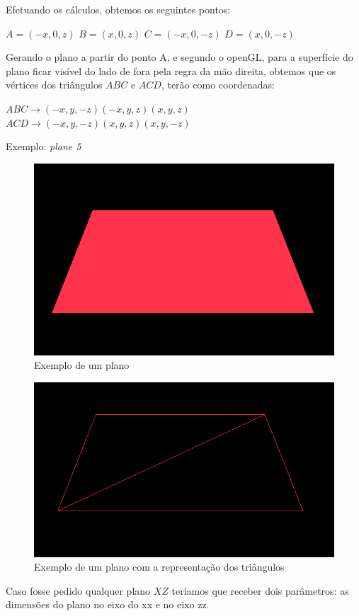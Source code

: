 \documentclass{article}
\begin{document}
Efetuando os cálculos, obtemos os seguintes pontos: \newline
\begin{center}
$A = (-x,0,z)$ \newline 
$B = (x,0,z)$ \newline 
$C = (-x,0,-z)$ \newline 
$D = (x,0,-z)$ \newline
\end{center}
Gerando o plano a partir do ponto A, e segundo o openGL, para a superfície do plano ficar visível do lado de fora pela regra da mão direita,
obtemos que os vértices dos triângulos $ABC$ e $ACD$, terão como coordenadas: \newline
\begin{center}
$ABC\rightarrow (-x,y,-z) (-x,y,z) (x,y,z) $ \newline
$ACD\rightarrow (-x,y,-z) (x,y,z) (x,y,-z)$ \newline
\end{center}
Exemplo: \textit{plane 5}
\begin{figure}[H]
\centering\includegraphics[scale=0.45]{plano1} 
\caption{\label{fig:controller}Exemplo de um plano}
\end{figure} \begin{figure}[H]
\centering\includegraphics[scale=0.45]{plano2} 
\caption{\label{fig:controller}Exemplo de um plano com a representação dos triângulos}
\end{figure} 
Caso fosse pedido qualquer plano $XZ$ teríamos que receber dois parâmetros: as dimensões do plano no eixo do xx e no eixo zz. 
\newpage
\end{document}

